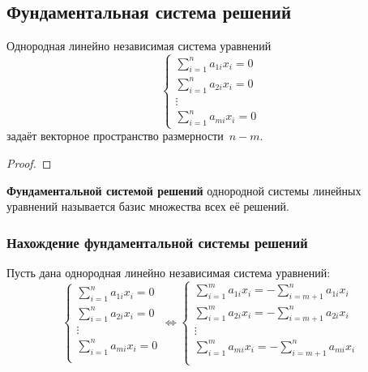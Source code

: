 \subsection{Фундаментальная система решений}
\begin{statement}
Однородная линейно независимая система уравнений
\begin{equation*}
\begin{cases}
\displaystyle \sum_{i=1}^n a_{1i} x_i = 0 \\
\displaystyle \sum_{i=1}^n a_{2i} x_i = 0 \\
\vdots \\
\displaystyle \sum_{i=1}^n a_{mi} x_i = 0
\end{cases}
\end{equation*}
задаёт векторное пространство размерности~$n - m$.
\end{statement}
\begin{proof}

\end{proof}

\textbf{Фундаментальной системой решений} однородной системы линейных уравнений называется базис множества всех её решений.

\subsubsection{Нахождение фундаментальной системы решений}
Пусть дана однородная линейно независимая система уравнений:
\begin{equation*}
\begin{cases}
\displaystyle \sum_{i=1}^n a_{1i} x_i = 0 \\
\displaystyle \sum_{i=1}^n a_{2i} x_i = 0 \\
\vdots \\
\displaystyle \sum_{i=1}^n a_{mi} x_i = 0 \\
\end{cases} \Leftrightarrow
\begin{cases}
\displaystyle \sum_{i=1}^m a_{1i} x_i = -\sum_{i=m+1}^n a_{1i} x_i \\
\displaystyle \sum_{i=1}^m a_{2i} x_i = -\sum_{i=m+1}^n a_{2i} x_i \\
\vdots \\
\displaystyle \sum_{i=1}^m a_{mi} x_i = -\sum_{i=m+1}^n a_{mi} x_i \\
\end{cases}
\end{equation*}

